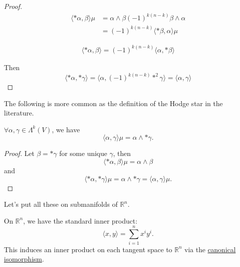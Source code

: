 \documentclass[notoc,notitlepage]{tufte-book}
\begin{document}
\begin{proof}
  \begin{align*}
    \langle *\alpha, \beta \rangle \mu &= \alpha \land \beta (-1)^{k(n-k)} \beta
    \land \alpha \\
                                   &= (-1)^{k(n-k)} \langle * \beta, \alpha
                                   \rangle \mu
  \end{align*}

  \begin{align*}
    \langle *\alpha, \beta \rangle = (-1)^{k(n-k)} \langle \alpha, * \beta \rangle
  \end{align*}

  Then
  \begin{equation*}
    \langle *\alpha, *\gamma \rangle = \langle \alpha, (-1)^{k(n-k)} *^2 \gamma
    \rangle = \langle \alpha, \gamma \rangle
  \end{equation*}
\end{proof}

The following is more common as the definition of the Hodge star in the
literature.

\begin{crly}
  $\forall \alpha, \gamma \in \Lambda^k(V)$, we have
  \begin{equation*}
    \langle \alpha, \gamma \rangle \mu = \alpha \land * \gamma.
  \end{equation*}
\end{crly}

\begin{proof}
  Let $\beta = * \gamma$ for some unique $\gamma$, then
  \begin{equation*}
    \langle *\alpha, \beta \rangle \mu = \alpha \land \beta
  \end{equation*}
  and
  \begin{equation*}
    \langle *\alpha, *\gamma \rangle \mu  = \alpha \land * \gamma = \langle
    \alpha, \gamma \rangle \mu.
  \end{equation*}
\end{proof}

Let's put all these on submanifolds of $\mathbb{R}^n$.

On $\mathbb{R}^n$, we have the standard inner product:
\begin{equation*}
  \langle x, y \rangle = \sum_{i=1}^{n} x^i y^i.
\end{equation*}
This induces an inner product on each tangent space to $\mathbb{R}^n$ via the
\hyperref[propo:canonical_bijection_from_t_p_r_n_to_r_n_]{canonical
isomorphism}.
\end{document}
